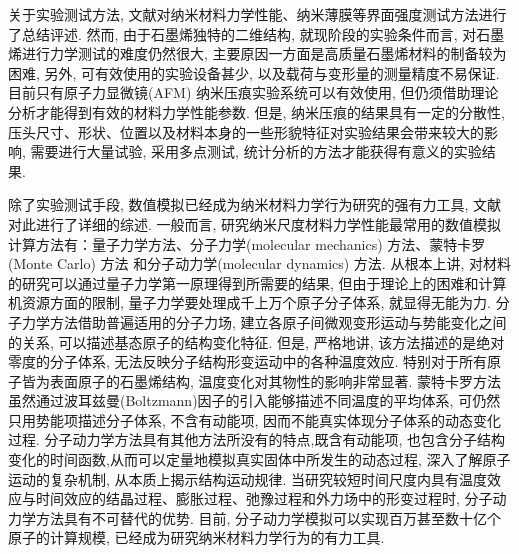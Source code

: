 \documentclass{APS}
\begin{document}
\begin{bicol}
关于实验测试方法, 文献对纳米材料力学性能、纳米薄膜等界面强度测试方法进行了总结评述. 然而, 由于石墨烯独特的二维结构, 就现阶段的实验条件而言, 对石墨烯进行力学测试的难度仍然很大, 主要原因一方面是高质量石墨烯材料的制备较为困难, 另外, 可有效使用的实验设备甚少, 以及载荷与变形量的测量精度不易保证. 目前只有原子力显微镜(AFM) 纳米压痕实验系统可以有效使用, 但仍须借助理论分析才能得到有效的材料力学性能参数. 但是, 纳米压痕的结果具有一定的分散性, 压头尺寸、形状、位置以及材料本身的一些形貌特征对实验结果会带来较大的影响, 需要进行大量试验, 采用多点测试, 统计分析的方法才能获得有意义的实验结果.

除了实验测试手段, 数值模拟已经成为纳米材料力学行为研究的强有力工具, 文献 对此进行了详细的综述. 一般而言, 研究纳米尺度材料力学性能最常用的数值模拟计算方法有：量子力学方法、分子力学(molecular mechanics) 方法、蒙特卡罗(Monte Carlo) 方法 和分子动力学(molecular dynamics) 方法. 从根本上讲, 对材料的研究可以通过量子力学第一原理得到所需要的结果, 但由于理论上的困难和计算机资源方面的限制, 量子力学要处理成千上万个原子分子体系, 就显得无能为力. 分子力学方法借助普遍适用的分子力场, 建立各原子间微观变形运动与势能变化之间的关系, 可以描述基态原子的结构变化特征. 但是, 严格地讲, 该方法描述的是绝对零度的分子体系, 无法反映分子结构形变运动中的各种温度效应. 特别对于所有原子皆为表面原子的石墨烯结构, 温度变化对其物性的影响非常显著. 蒙特卡罗方法虽然通过波耳兹曼(Boltzmann)因子的引入能够描述不同温度的平均体系, 可仍然只用势能项描述分子体系, 不含有动能项, 因而不能真实体现分子体系的动态变化过程. 分子动力学方法具有其他方法所没有的特点,既含有动能项, 也包含分子结构变化的时间函数,从而可以定量地模拟真实固体中所发生的动态过程, 深入了解原子运动的复杂机制, 从本质上揭示结构运动规律. 当研究较短时间尺度内具有温度效应与时间效应的结晶过程、膨胀过程、弛豫过程和外力场中的形变过程时, 分子动力学方法具有不可替代的优势. 目前, 分子动力学模拟可以实现百万甚至数十亿个原子的计算规模, 已经成为研究纳米材料力学行为的有力工具.


\end{bicol}
\end{document}
